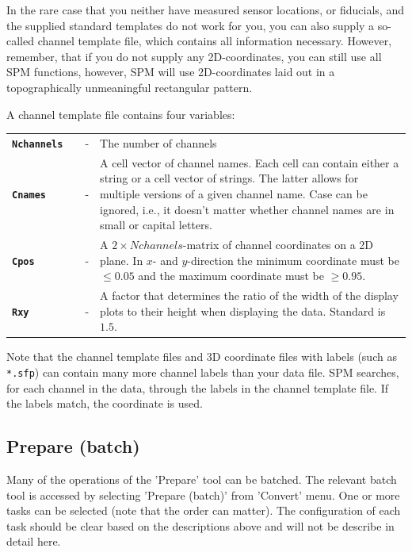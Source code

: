 In the rare case that you neither have measured sensor locations, or fiducials, and the supplied standard templates do not work for you, you can also supply a so-called channel template file, which contains all information necessary. However, remember, that if you do not supply any 2D-coordinates, you can still use all SPM functions, however, SPM will use 2D-coordinates laid out in a topographically unmeaningful rectangular pattern.

A channel template file contains four variables:\\

\begin{tabular}{llcp{9cm}}

{\bf \texttt{Nchannels}} & &  - & The number of channels\\

{\bf \texttt{Cnames}}&  & - & A cell vector of channel names. Each cell can contain either a string or a cell vector of strings. The latter allows
for multiple versions of a given channel name. Case can be ignored, i.e., it doesn't matter whether channel names are in small or capital letters.\\

{\bf \texttt{Cpos}} & & - & A $2 \times Nchannels$-matrix of channel coordinates on a 2D plane. In $x$- and $y$-direction the minimum coordinate must be $\leq 0.05$ and the maximum coordinate must be $\geq 0.95$. \\

{\bf \texttt{Rxy}} & & - & A factor that determines the ratio of the width of the display plots to their height when displaying the data. Standard is $1.5$. \\

\end{tabular}

Note that the channel template files and 3D coordinate files with labels (such as \texttt{*.sfp}) can contain many more channel labels than your data file. SPM searches, for each channel in the data, through the labels in the channel template file. If the labels match, the coordinate is used.

\subsection{Prepare (batch)}
Many of the operations of the 'Prepare' tool can be batched. The relevant batch tool is accessed by selecting 'Prepare (batch)' from 'Convert' menu.  One or more tasks can be selected (note that the order can matter). The configuration of each task should be clear based on the descriptions above and will not be describe in detail here. 

